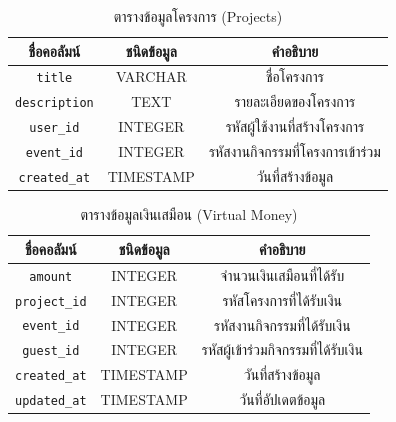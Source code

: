 \begin{table}[hb]
    \centering
    \begin{tabular}{|c|c|c|}
        \hline
        ชื่อคอลัมน์             & ชนิดข้อมูล   & คำอธิบาย                     \\ \hline
        \verb |title|       & VARCHAR   & ชื่อโครงการ                  \\ \hline
        \verb |description| & TEXT      & รายละเอียดของโครงการ        \\ \hline
        \verb |user_id|     & INTEGER   & รหัสผู้ใช้งานที่สร้างโครงการ      \\ \hline
        \verb |event_id|    & INTEGER   & รหัสงานกิจกรรมที่โครงการเข้าร่วม \\ \hline
        \verb |created_at|  & TIMESTAMP & วันที่สร้างข้อมูล                \\ \hline
    \end{tabular}
    \caption{ตารางข้อมูลโครงการ (Projects)}
    \label{tab:project_data}
\end{table}

\begin{table}[ht]
    \centering
    \begin{tabular}{|c|c|c|}
        \hline
        ชื่อคอลัมน์            & ชนิดข้อมูล   & คำอธิบาย                   \\ \hline
        \verb |amount|     & INTEGER   & จำนวนเงินเสมือนที่ได้รับ        \\ \hline
        \verb |project_id| & INTEGER   & รหัสโครงการที่ได้รับเงิน       \\ \hline
        \verb |event_id|   & INTEGER   & รหัสงานกิจกรรมที่ได้รับเงิน     \\ \hline
        \verb |guest_id|   & INTEGER   & รหัสผู้เข้าร่วมกิจกรรมที่ได้รับเงิน \\ \hline
        \verb |created_at| & TIMESTAMP & วันที่สร้างข้อมูล              \\ \hline
        \verb |updated_at| & TIMESTAMP & วันที่อัปเดตข้อมูล             \\ \hline
    \end{tabular}
    \caption{ตารางข้อมูลเงินเสมือน (Virtual Money)}
    \label{tab:virtual_money_data}
\end{table}

